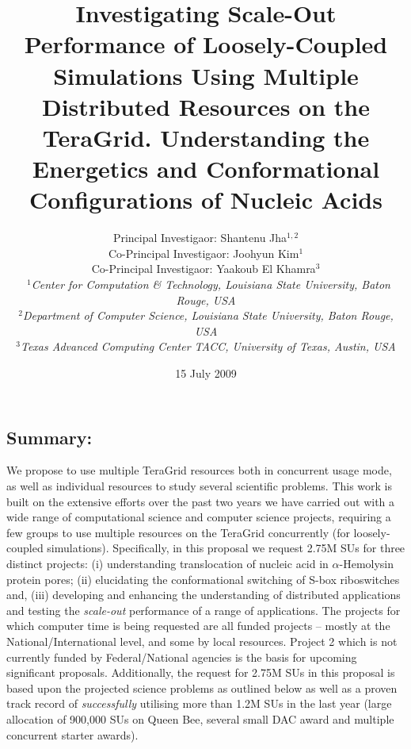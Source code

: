 \documentclass[a4paper,10pt]{article}
\begin{document}
\title{\large Investigating Scale-Out Performance of 
Loosely-Coupled Simulations Using Multiple Distributed Resources on the TeraGrid. Understanding the Energetics and Conformational Configurations of Nucleic Acids}

\author{Principal Investigaor: Shantenu Jha$^{1,2}$ \\ Co-Principal Investigaor: Joohyun Kim$^{1}$ \\ Co-Principal Investigaor: Yaakoub El Khamra$^{3}$\\\
   \small{\emph{$^{1}$Center for Computation \& Technology, Louisiana State University, Baton Rouge, 
USA}}
\\
  \small{\emph{$^{2}$Department of Computer Science, Louisiana State
      University, Baton Rouge, USA}}
\\
  \small{\emph{$^{3}$Texas Advanced Computing Center TACC, University of Texas, Austin, USA}}}

\newif\ifdraft
\drafttrue
\ifdraft
\newcommand{\amnote}[1]{ {\textcolor{magenta} { ***AM: #1c }}}
\newcommand{\jhanote}[1]{ {\textcolor{red} { ***SJ: #1 }}}
\newcommand{\michaelnote}[1]{ {\textcolor{blue} { ***MM: #1 }}}
\else
\newcommand{\amnote}[1]{}
\newcommand{\jhanote}[1]{}
\newcommand{\michaelnote}[1]{ {\textcolor{blue} { ***MM: #1 }}}
\fi


\date{15 July 2009}

\maketitle

\subsection*{Summary:} 

We propose to use multiple TeraGrid resources both in concurrent usage mode, as well as individual resources to study several scientific problems.  This work is built on the extensive efforts over the past two years we have carried out with a wide range of computational science and computer science projects, requiring a few groups to use multiple resources on the TeraGrid concurrently (for loosely-coupled simulations).  Specifically, in this proposal we request 2.75M SUs for three distinct projects: (i) understanding translocation of nucleic acid in $\alpha$-Hemolysin protein pores; (ii) elucidating the conformational switching of S-box riboswitches and, (iii) developing and enhancing the understanding of distributed applications and testing the {\it scale-out } performance of a range of applications. The projects for which computer time is being requested are all funded projects -- mostly at the National/International level, and some by local resources. Project 2 which is not currently funded by Federal/National agencies is the basis for upcoming significant proposals.  Additionally, the request for 2.75M SUs in this proposal is based upon the projected science problems as outlined below as well as a proven track record of {\it successfully} utilising more than 1.2M SUs in the last year (large allocation of 900,000 SUs on Queen Bee, several small DAC award and multiple concurrent starter awards).
\end{document}
